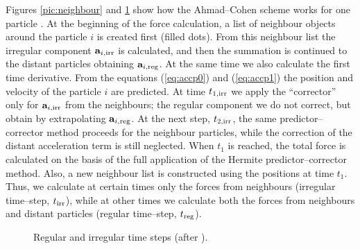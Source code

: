 Figures \ref{pic:neighbour} and \ref{pic:regtimes} show how
the Ahmad--Cohen scheme works for one particle \cite{ma_92}.
At the beginning of the force calculation, a list of neighbour
objects around the particle $i$ is created first (filled dots).
From this neighbour list the irregular component
$\mathbf a_{i,{\rm irr}}$ is calculated, and then the
summation is continued to the distant particles obtaining
$\mathbf a_{i,{\rm reg}}$.
At the same time we also calculate the first time derivative.
From the equations (\ref{eq:accp0}) and (\ref{eq:accp1})
the position and velocity of the particle $i$ are predicted.
At time $t_{1,{\rm irr}}$ we apply the ``corrector'' only for
$\mathbf a_{i,{\rm irr}}$ from the neighbours;
the regular component we do not correct, but obtain by
extrapolating $\mathbf a_{i,{\rm reg}}$.
At the next step, $t_{2,{\rm irr}}$, the same predictor--corrector
method proceeds for the neighbour particles,
while the correction of the distant acceleration term is
still neglected.
When $t_1$ is reached, the total force is calculated on the
basis of the full application of the Hermite predictor--corrector
method.
Also, a new neighbour list is constructed using the positions
at time $t_1$.   %
%
Thus, we calculate at certain times only the forces from
neighbours (irregular time--step, $t_{\rm irr}$),
while at other times we calculate both the forces from neighbours
and distant particles (regular time--step, $t_{\rm reg}$).


\noindent
\begin{figure}[hb]
\centering
{}
  \vspace{1ex}
  \caption{Regular and irregular time steps (after
           \cite{ma_92}).}
  \label{pic:regtimes}
\end{figure}
%


